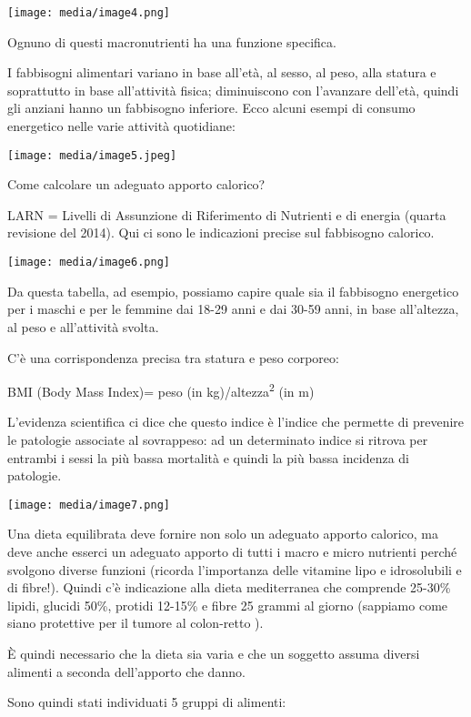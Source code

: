 \documentclass[]{article}
\begin{document}
\texttt{[image: media/image4.png]}

Ognuno di questi macronutrienti ha una funzione specifica.

I fabbisogni alimentari variano in base all'età, al sesso, al peso, alla
statura e soprattutto in base all'attività fisica; diminuiscono con
l'avanzare dell'età, quindi gli anziani hanno un fabbisogno inferiore.
Ecco alcuni esempi di consumo energetico nelle varie attività
quotidiane:

\texttt{[image: media/image5.jpeg]}

Come calcolare un adeguato apporto calorico?

LARN = Livelli di Assunzione di Riferimento di Nutrienti e di energia
(quarta revisione del 2014). Qui ci sono le indicazioni precise sul
fabbisogno calorico.

\texttt{[image: media/image6.png]}

Da questa tabella, ad esempio, possiamo capire quale sia il fabbisogno
energetico per i maschi e per le femmine dai 18-29 anni e dai 30-59
anni, in base all'altezza, al peso e all'attività svolta.

C'è una corrispondenza precisa tra statura e peso corporeo:

BMI (Body Mass Index)= peso (in kg)/altezza\textsuperscript{2} (in m)

L'evidenza scientifica ci dice che questo indice è l'indice che permette
di prevenire le patologie associate al sovrappeso: ad un determinato
indice si ritrova per entrambi i sessi la più bassa mortalità e quindi
la più bassa incidenza di patologie.

\texttt{[image: media/image7.png]}

Una dieta equilibrata deve fornire non solo un adeguato apporto
calorico, ma deve anche esserci un adeguato apporto di tutti i macro e
micro nutrienti perché svolgono diverse funzioni (ricorda l'importanza
delle vitamine lipo e idrosolubili e di fibre!). Quindi c'è indicazione
alla dieta mediterranea che comprende 25-30\% lipidi, glucidi 50\%,
protidi 12-15\% e fibre 25 grammi al giorno (sappiamo come siano
protettive per il tumore al colon-retto ).

È quindi necessario che la dieta sia varia e che un soggetto assuma
diversi alimenti a seconda dell'apporto che danno.

Sono quindi stati individuati 5 gruppi di alimenti:
\end{document}
